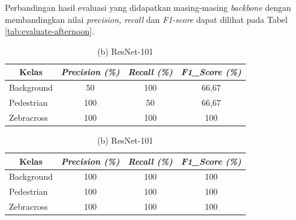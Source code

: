 Perbandingan hasil evaluasi yang didapatkan masing-masing \textit{backbone} dengan membandingkan nilai \textit{precision, recall} dan \textit{F1-score} dapat dilihat pada Tabel \ref{tab:evaluate-afternoon}.

\begin{table}[!h]
	\centering
	\caption{{Perbandingan Hasil Evaluasi pada Siang Hari}}
	\begin{minipage}[b]{\textwidth}
		\centering
		\caption*{(a) ResNet-50}
		\begin{tabular}{|l|c|c|c|}
			\hline
			\multicolumn{1}{|c|}{\textbf{Kelas}} & \textit{\textbf{Precision (\%)}} & \textit{\textbf{Recall (\%)}} & \textit{\textbf{F1\_Score (\%)}} \\ \hline
			Background                           & 50                               & 100                            & 66,67                            \\ \hline
			Pedestrian                           & 100                              & 50                           & 66,67                              \\ \hline
			Zebracross                           & 100                               & 100                           & 100                            \\ \hline
			
		\end{tabular}
	\end{minipage}
	\vfill
	\begin{minipage}[b]{\textwidth}
		\centering
		\caption*{(b) ResNet-101}
		\begin{tabular}{|l|c|c|c|}
			\hline
			\multicolumn{1}{|c|}{\textbf{Kelas}} & \textit{\textbf{Precision (\%)}} & \textit{\textbf{Recall (\%)}} & \textit{\textbf{F1\_Score (\%)}} \\ \hline
			Background                           & 100                              & 100                            & 100                               \\ \hline
			Pedestrian                           & 100                              & 100                           & 100                              \\ \hline
			Zebracross                           & 100                               & 100                           & 100                            \\ \hline
			

\end{tabular}
\end{minipage}
\end{table}
